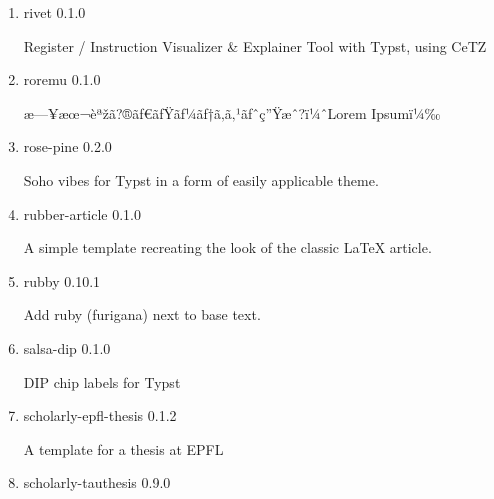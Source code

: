 \begin{enumerate}
  { riesketcher } { 0.2.1 }

  A package to draw Riemann sums (and their plots) of a function with
  CeTZ.
\item
  \href{/universe/package/rivet/}{}

  { rivet } { 0.1.0 }

  Register / Instruction Visualizer \& Explainer Tool with Typst, using
  CeTZ
\item
  \href{/universe/package/roremu/}{}

  { roremu } { 0.1.0 }

  æ---¥æœ¬èªžã?®ãƒ€ãƒŸãƒ¼ãƒ†ã‚­ã‚¹ãƒˆç''Ÿæˆ?ï¼ˆLorem Ipsumï¼‰
\item
  \href{/universe/package/rose-pine/}{}

  { rose-pine } { 0.2.0 }

  Soho vibes for Typst in a form of easily applicable theme.
\item
  \href{/universe/package/rubber-article/}{}


  { rubber-article } { 0.1.0 }

  A simple template recreating the look of the classic LaTeX article.
\item
  \href{/universe/package/rubby/}{}

  { rubby } { 0.10.1 }

  Add ruby (furigana) next to base text.
\item
  \href{/universe/package/salsa-dip/}{}

  { salsa-dip } { 0.1.0 }

  DIP chip labels for Typst
\item
  \href{/universe/package/scholarly-epfl-thesis/}{}


  { scholarly-epfl-thesis } { 0.1.2 }

  A template for a thesis at EPFL
\item
  \href{/universe/package/scholarly-tauthesis/}{}


  { scholarly-tauthesis } { 0.9.0 }


\end{enumerate}
